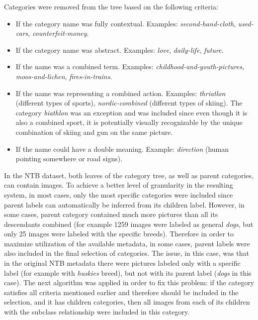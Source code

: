     Categories were removed from the tree based on the following criteria:
    \begin{itemize}
        \item If the category name was fully contextual. Examples: \textit{second-hand-cloth}, \textit{used-cars}, \textit{counterfeit-money}.
        \item If the category name was abstract. Examples: \textit{love}, \textit{daily-life}, \textit{future}.
        \item If the name was a combined term. Examples: \textit{childhood-and-youth-pictures}, \textit{moos-and-lichen}, \textit{fires-in-trains}. %
        \item If the name was representing a combined action. Examples: \textit{thriatlon} (different types of sports), \textit{nordic-combined} (different types of skiing). The category \textit{biathlon} was an exception and was included since even though it is also a combined sport, it is potentially visually recognizable by the unique combination of skiing and gun on the same picture.
        \item If the name could have a double meaning. Example: \textit{direction} (human pointing somewhere or road signs).
    \end{itemize}
    
    In the NTB dataset, both leaves of the category tree, as well as parent categories, can contain images. To achieve a better level of granularity in the resulting system, in most cases, only the most specific categories were included since parent labels can automatically be inferred from its children label. However, in some cases, parent category contained much more pictures than all its descendants combined (for example 1259 images were labeled as general \textit{dogs}, but only 25 images were labeled with the specific breeds). Therefore in order to maximize utilization of the available metadata, in some cases, parent labels were also included in the final selection of categories. The issue, in this case, was that in the original NTB metadata there were pictures labeled only with a specific label (for example with \textit{huskies} breed), but not with its parent label (\textit{dogs} in this case). The next algorithm was applied in order to fix this problem: if the category satisfies all criteria mentioned earlier and therefore should be included in the selection, and it has children categories, then all images from each of its children with the subclass relationship were included in this category.
    
